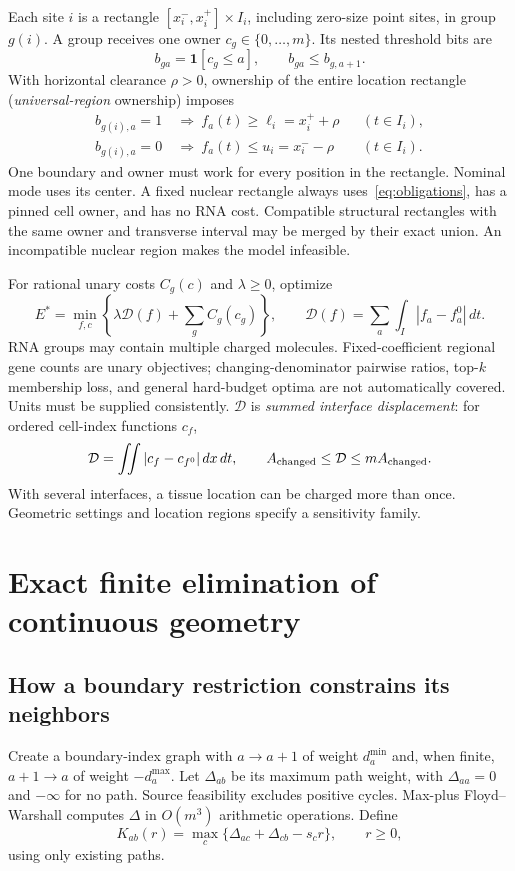 \documentclass[10pt,letterpaper]{article}
\newcommand{\D}{\mathcal D}
\newcommand{\ind}{\mathbf 1}
\begin{document}
Each site $i$ is a rectangle $[x_i^-,x_i^+]\times I_i$, including zero-size point sites, in group $g(i)$. A group receives one owner $c_g\in\{0,\ldots,m\}$. Its nested threshold bits are
\begin{equation}
 b_{ga}=\ind[c_g\le a],\qquad b_{ga}\le b_{g,a+1}.\label{eq:bits}
\end{equation}
With horizontal clearance $\rho>0$, ownership of the entire location rectangle (\emph{universal-region} ownership) imposes
\begin{align}
 b_{g(i),a}=1&\ \Longrightarrow\ f_a(t)\ge\ell_i=x_i^++\rho &&(t\in I_i),\nonumber\\
 b_{g(i),a}=0&\ \Longrightarrow\ f_a(t)\le u_i=x_i^--\rho &&(t\in I_i).\label{eq:obligations}
\end{align}
One boundary and owner must work for every position in the rectangle. Nominal mode uses its center. A fixed nuclear rectangle always uses~\eqref{eq:obligations}, has a pinned cell owner, and has no RNA cost. Compatible structural rectangles with the same owner and transverse interval may be merged by their exact union. An incompatible nuclear region makes the model infeasible.

For rational unary costs $C_g(c)$ and $\lambda\ge0$, optimize
\begin{equation}
 E^*=\min_{f,c}\left\{\lambda\D(f)+\sum_g C_g(c_g)\right\},\qquad
 \D(f)=\sum_a\int_I |f_a-f_a^0|\,dt.\label{eq:objective}
\end{equation}
RNA groups may contain multiple charged molecules. Fixed-coefficient regional gene counts are unary objectives; changing-denominator pairwise ratios, top-$k$ membership loss, and general hard-budget optima are not automatically covered. Units must be supplied consistently. $\D$ is \emph{summed interface displacement}: for ordered cell-index functions $c_f$,
\begin{equation}
 \D=\iint|c_f-c_{f^0}|\,dx\,dt,\qquad A_{\rm changed}\le\D\le m A_{\rm changed}.\label{eq:area}
\end{equation}
With several interfaces, a tissue location can be charged more than once. Geometric settings and location regions specify a sensitivity family.

\section{Exact finite elimination of continuous geometry}\label{sec:theory}
\subsection{How a boundary restriction constrains its neighbors}
Create a boundary-index graph with $a\to a+1$ of weight $d_a^{\min}$ and, when finite, $a+1\to a$ of weight $-d_a^{\max}$. Let $\Delta_{ab}$ be its maximum path weight, with $\Delta_{aa}=0$ and $-\infty$ for no path. Source feasibility excludes positive cycles. Max-plus Floyd--Warshall computes $\Delta$ in $O(m^3)$ arithmetic operations. Define
\begin{equation}
 K_{ab}(r)=\max_c\{\Delta_{ac}+\Delta_{cb}-s_c r\},\qquad r\ge0,\label{eq:kernel}
\end{equation}
using only existing paths.
\end{document}
